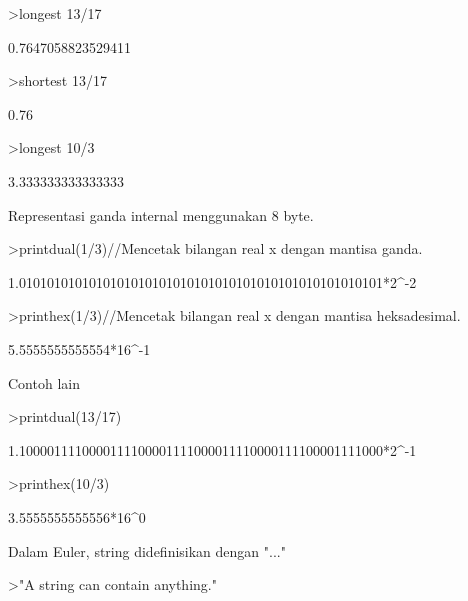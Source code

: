 \documentclass[12pt,arial,letterpaper]{book}
\begin{document}
\begin{eulerprompt}
>longest 13/17
\end{eulerprompt}
\begin{euleroutput}
       0.7647058823529411 
\end{euleroutput}
\begin{eulerprompt}
>shortest 13/17
\end{eulerprompt}
\begin{euleroutput}
    0.76 
\end{euleroutput}
\begin{eulerprompt}
>longest 10/3
\end{eulerprompt}
\begin{euleroutput}
        3.333333333333333 
\end{euleroutput}
\begin{eulercomment}
Representasi ganda internal menggunakan 8 byte.
\end{eulercomment}
\begin{eulerprompt}
>printdual(1/3)//Mencetak bilangan real x dengan mantisa ganda.
\end{eulerprompt}
\begin{euleroutput}
  1.0101010101010101010101010101010101010101010101010101*2^-2
\end{euleroutput}
\begin{eulerprompt}
>printhex(1/3)//Mencetak bilangan real x dengan mantisa heksadesimal.
\end{eulerprompt}
\begin{euleroutput}
  5.5555555555554*16^-1
\end{euleroutput}
\begin{eulercomment}
Contoh lain
\end{eulercomment}
\begin{eulerprompt}
>printdual(13/17)
\end{eulerprompt}
\begin{euleroutput}
  1.1000011110000111100001111000011110000111100001111000*2^-1
\end{euleroutput}
\begin{eulerprompt}
>printhex(10/3)
\end{eulerprompt}
\begin{euleroutput}
  3.5555555555556*16^0
\end{euleroutput}
\begin{eulercomment}
Dalam Euler, string didefinisikan dengan "..."
\end{eulercomment}
\begin{eulerprompt}
>"A string can contain anything."
\end{eulerprompt}
\end{document}
